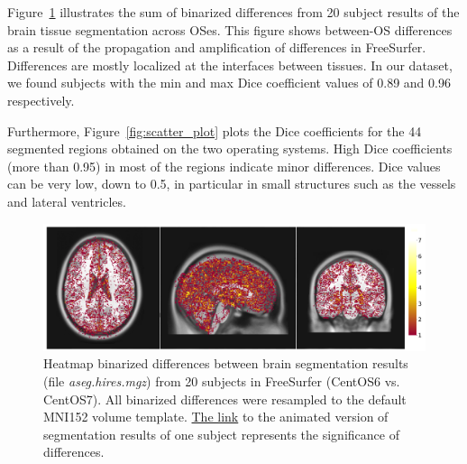 \documentclass[a4paper,num-refs]{oup-contemporary}
\begin{document}
Figure~\ref{fig:tissue_class} illustrates the sum of binarized differences 
from 20 subject results of the brain tissue segmentation across OSes.
This figure shows between-OS differences  
as a result of the propagation and amplification of differences in FreeSurfer. 
Differences are mostly localized at the interfaces between tissues.
In our dataset, we found subjects with the min and max Dice coefficient 
values of 0.89 and 0.96 respectively.

Furthermore, Figure~\ref{fig:scatter_plot} plots the Dice coefficients 
for the 44 segmented regions obtained on the two operating systems.
High Dice coefficients (more than 0.95) in most of the regions indicate minor differences.
Dice values can be very low, down to 0.5, in particular in small structures 
such as the vessels and lateral ventricles.


\begin{figure}
\centering
  \includegraphics[width=\columnwidth]{images/brain_segmentation_mni.png} 
  \caption{Heatmap binarized differences between brain segmentation results (file \emph{aseg.hires.mgz}) from 
          20 subjects in FreeSurfer (CentOS6 vs. CentOS7). 
          All binarized differences were resampled to the default MNI152 volume template.
          \href{https://github.com/ali4006/HCP-reproducibility-paper/blob/master/images/fs_brain_segmentation.gif}
          {The link} to the animated version of segmentation results of one subject represents the significance of differences.} 
  \label{fig:tissue_class}
\end{figure}
\end{document}
